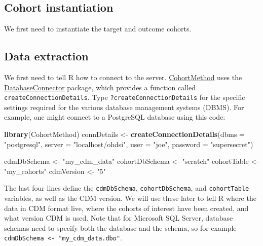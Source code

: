 \documentclass[]{book}
\newenvironment{Shaded}{\begin{snugshade}}{\end{snugshade}}
\newcommand{\DataTypeTok}[1]{\textcolor[rgb]{0.13,0.29,0.53}{#1}}
\newcommand{\KeywordTok}[1]{\textcolor[rgb]{0.13,0.29,0.53}{\textbf{#1}}}
\newcommand{\NormalTok}[1]{#1}
\newcommand{\StringTok}[1]{\textcolor[rgb]{0.31,0.60,0.02}{#1}}
\begin{document}
\hypertarget{cohort-instantiation}{%
\subsection{Cohort instantiation}\label{cohort-instantiation}}

We first need to instantiate the target and outcome cohorts.

\hypertarget{data-extraction}{%
\subsection{Data extraction}\label{data-extraction}}

We first need to tell R how to connect to the server. \href{https://ohdsi.github.io/CohortMethod/}{CohortMethod} uses the \href{https://ohdsi.github.io/DatabaseConnector/}{DatabaseConnector} package, which provides a function called \texttt{createConnectionDetails}. Type \texttt{?createConnectionDetails} for the specific settings required for the various database management systems (DBMS). For example, one might connect to a PostgreSQL database using this code:

\begin{Shaded}
\begin{Highlighting}[]
\KeywordTok{library}\NormalTok{(CohortMethod)}
\NormalTok{connDetails <-}\StringTok{ }\KeywordTok{createConnectionDetails}\NormalTok{(}\DataTypeTok{dbms =} \StringTok{"postgresql"}\NormalTok{,}
                                       \DataTypeTok{server =} \StringTok{"localhost/ohdsi"}\NormalTok{,}
                                       \DataTypeTok{user =} \StringTok{"joe"}\NormalTok{,}
                                       \DataTypeTok{password =} \StringTok{"supersecret"}\NormalTok{)}

\NormalTok{cdmDbSchema <-}\StringTok{ "my_cdm_data"}
\NormalTok{cohortDbSchema <-}\StringTok{ "scratch"}
\NormalTok{cohortTable <-}\StringTok{ "my_cohorts"}
\NormalTok{cdmVersion <-}\StringTok{ "5"}
\end{Highlighting}
\end{Shaded}

The last four lines define the \texttt{cdmDbSchema}, \texttt{cohortDbSchema}, and \texttt{cohortTable} variables, as well as the CDM version. We will use these later to tell R where the data in CDM format live, where the cohorts of interest have been created, and what version CDM is used. Note that for Microsoft SQL Server, database schemas need to specify both the database and the schema, so for example \texttt{cdmDbSchema\ \textless{}-\ "my\_cdm\_data.dbo"}.
\end{document}
